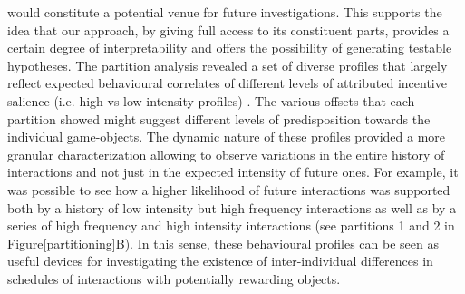 would constitute a potential venue for future investigations. This supports the idea that our approach, by giving full access to its constituent parts, provides a certain degree of interpretability and offers the possibility of generating testable hypotheses. The partition analysis revealed a set of diverse profiles that largely reflect expected behavioural correlates of different levels of attributed incentive salience (i.e. high vs low intensity profiles) \cite{berridge2004motivation}. The various offsets that each partition showed might suggest different levels of predisposition towards the individual game-objects. The dynamic nature of these profiles provided a more granular characterization allowing to observe variations in the entire history of interactions and not just in the expected intensity of future ones. For example, it was possible to see how a higher likelihood of future interactions was supported both by a history of low intensity but high frequency interactions as well as by a series of high frequency and high intensity interactions (see partitions 1 and 2 in Figure\ref{partitioning}B). In this sense, these behavioural profiles can be seen as useful devices for investigating the existence of inter-individual differences in schedules of interactions with potentially rewarding objects.
